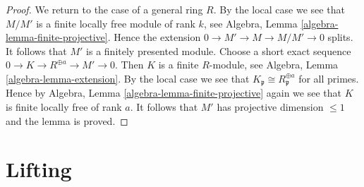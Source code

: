 \begin{proof}
\medskip\noindent
We return to the case of a general ring $R$. By the local case
we see that $M/M'$ is a finite locally free module of rank $k$, see
Algebra, Lemma \ref{algebra-lemma-finite-projective}. Hence the extension
$0 \to M' \to M \to M/M' \to 0$ splits. It follows that $M'$
is a finitely presented module. Choose a short exact sequence
$0 \to K \to R^{\oplus a} \to M' \to 0$. Then $K$ is a finite
$R$-module, see Algebra, Lemma \ref{algebra-lemma-extension}.
By the local case we see that $K_\mathfrak p \cong R_\mathfrak p^{\oplus a}$
for all primes. Hence by
Algebra, Lemma \ref{algebra-lemma-finite-projective}
again we see that $K$ is finite locally free of rank $a$.
It follows that $M'$ has projective dimension $\leq 1$
and the lemma is proved.
\end{proof}










\section{Lifting}
\label{section-lifting}

